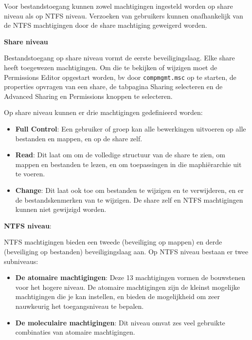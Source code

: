 \begin{enumerate}
{		}
		
		 { 
			Voor bestandstoegang kunnen zowel machtigingen ingesteld worden op share niveau als op NTFS niveau. Verzoeken van gebruikers kunnen onafhankelijk van de NTFS machtigingen door de share machtiging geweigerd worden. 
				\item \textbf{Share niveau}
				
				Bestandstoegang op share niveau vormt de eerste beveiligingslaag. Elke share heeft toegewezen machtigingen. Om die te bekijken of wijzigen moet de Permissions Editor opgestart worden, bv door \texttt{compmgmt.msc} op te starten, de properties opvragen van een share, de tabpagina Sharing selecteren en de Advanced Sharing en Permissions knoppen te selecteren.

				Op share niveau kunnen er drie machtigingen gedefinieerd worden:
				\begin{itemize}
					\item \textbf{Full Control}: Een gebruiker of groep kan alle bewerkingen uitvoeren op alle bestanden en mappen, en op de share zelf. 
					\item \textbf{Read}: Dit laat om om de volledige structuur van de share te zien, om mappen en bestanden te lezen, en om toepassingen in die maphiërarchie uit te voeren.
					\item \textbf{Change}: Dit laat ook toe om bestanden te wijzigen en te verwijderen, en er de bestandskenmerken van te wijzigen. De share zelf en NTFS machtigingen kunnen niet gewijzigd worden.
				\end{itemize}
				\item \textbf{NTFS niveau}:
				
				NTFS machtigingen bieden een tweede (beveiliging op mappen) en derde (beveiliging op bestanden) beveiligingslaag aan. Op NTFS niveau bestaan er twee subniveaus:
				\begin{itemize}
					\item \textbf{De atomaire machtigingen}: Deze 13 machtigingen vormen de bouwstenen voor het hogere niveau. De atomaire machtigingen zijn de kleinst mogelijke machtigingen die je kan instellen, en bieden de mogelijkheid om zeer nauwkeurig het toegangsniveau te bepalen. 
					\item \textbf{De moleculaire machtigingen}: Dit niveau omvat zes veel gebruikte combinaties van atomaire machtigingen. 
				\end{itemize}

}
\end{enumerate}

